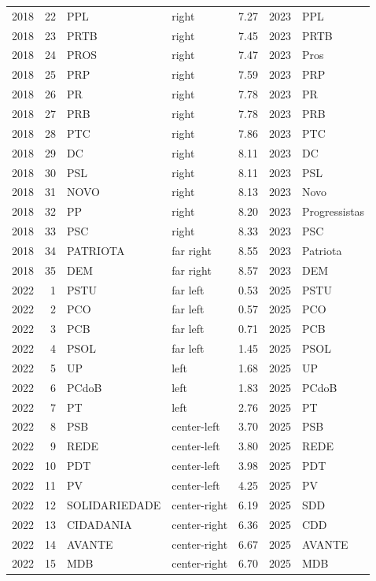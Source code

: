 \documentclass[11pt]{article}
\begin{document}
\begin{longtable}{rrlllrl}
2018 & 22 & PPL & right & 7.27 & 2023 & PPL \\
2018 & 23 & PRTB & right & 7.45 & 2023 & PRTB \\
2018 & 24 & PROS & right & 7.47 & 2023 & Pros \\
2018 & 25 & PRP & right & 7.59 & 2023 & PRP \\
2018 & 26 & PR & right & 7.78 & 2023 & PR \\
2018 & 27 & PRB & right & 7.78 & 2023 & PRB \\
2018 & 28 & PTC & right & 7.86 & 2023 & PTC \\
2018 & 29 & DC & right & 8.11 & 2023 & DC \\
2018 & 30 & PSL & right & 8.11 & 2023 & PSL \\
2018 & 31 & NOVO & right & 8.13 & 2023 & Novo \\
2018 & 32 & PP & right & 8.20 & 2023 & Progressistas \\
2018 & 33 & PSC & right & 8.33 & 2023 & PSC \\
2018 & 34 & PATRIOTA & far right & 8.55 & 2023 & Patriota \\
2018 & 35 & DEM & far right & 8.57 & 2023 & DEM \\
2022 & 1 & PSTU & far left & 0.53 & 2025 & PSTU \\
2022 & 2 & PCO & far left & 0.57 & 2025 & PCO \\
2022 & 3 & PCB & far left & 0.71 & 2025 & PCB \\
2022 & 4 & PSOL & far left & 1.45 & 2025 & PSOL \\
2022 & 5 & UP & left & 1.68 & 2025 & UP \\
2022 & 6 & PCdoB & left & 1.83 & 2025 & PCdoB \\
2022 & 7 & PT & left & 2.76 & 2025 & PT \\
2022 & 8 & PSB & center-left & 3.70 & 2025 & PSB \\
2022 & 9 & REDE & center-left & 3.80 & 2025 & REDE \\
2022 & 10 & PDT & center-left & 3.98 & 2025 & PDT \\
2022 & 11 & PV & center-left & 4.25 & 2025 & PV \\
2022 & 12 & SOLIDARIEDADE & center-right & 6.19 & 2025 & SDD \\
2022 & 13 & CIDADANIA & center-right & 6.36 & 2025 & CDD \\
2022 & 14 & AVANTE & center-right & 6.67 & 2025 & AVANTE \\
2022 & 15 & MDB & center-right & 6.70 & 2025 & MDB \\

\end{longtable}
\end{document}
